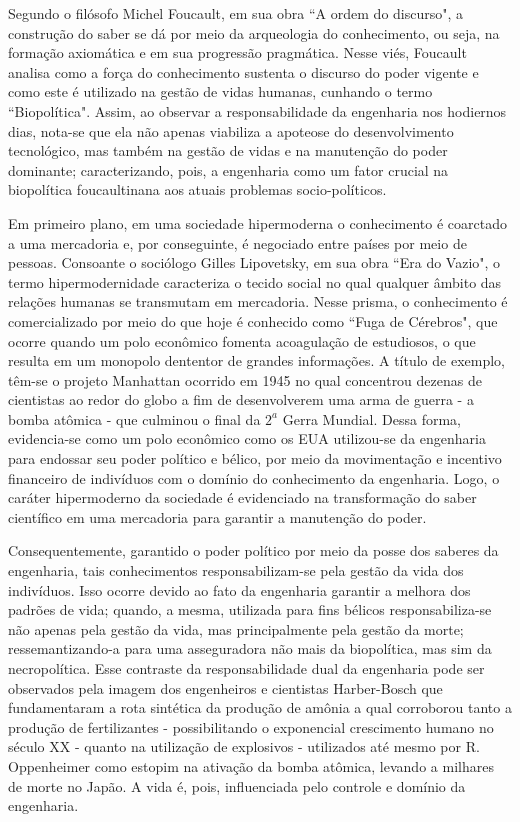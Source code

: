\documentclass{article}
\begin{document}
Segundo o filósofo Michel Foucault, em sua obra “A ordem do discurso", a construção do saber se dá por meio da arqueologia do conhecimento, ou seja, na formação axiomática e em sua progressão pragmática. Nesse viés, Foucault analisa como a força do conhecimento sustenta o discurso do poder vigente e como este é utilizado na gestão de vidas humanas, cunhando o termo “Biopolítica". Assim, ao observar a responsabilidade da engenharia nos hodiernos dias, nota-se que ela não apenas viabiliza a apoteose do desenvolvimento tecnológico, mas também na gestão de vidas e na manutenção do poder dominante; caracterizando, pois, a engenharia como um fator crucial na biopolítica foucaultinana aos atuais problemas socio-políticos.

Em primeiro plano, em uma sociedade hipermoderna o conhecimento é coarctado a uma mercadoria e, por conseguinte, é negociado entre países por meio de pessoas. Consoante o sociólogo Gilles Lipovetsky, em sua obra “Era do Vazio", o termo hipermodernidade caracteriza o tecido social no qual qualquer âmbito das relações humanas se transmutam em mercadoria. Nesse prisma, o conhecimento é comercializado por meio do que hoje é conhecido como “Fuga de Cérebros", que ocorre quando um polo econômico fomenta acoagulação de estudiosos, o que resulta em um monopolo dententor de grandes informações. A título de exemplo, têm-se o projeto Manhattan ocorrido em 1945 no qual concentrou dezenas de cientistas ao redor do globo a fim de desenvolverem uma arma de guerra - a bomba atômica - que culminou o final da $2^a$ Gerra Mundial. Dessa forma, evidencia-se como um polo econômico como os EUA utilizou-se da engenharia para endossar seu poder político e bélico,  por meio da movimentação e incentivo financeiro de indivíduos com o domínio do conhecimento da engenharia. Logo, o caráter hipermoderno da sociedade é evidenciado na transformação do saber científico em uma mercadoria para garantir a manutenção do poder.

Consequentemente, garantido o poder político por meio da posse dos saberes da engenharia, tais conhecimentos responsabilizam-se pela gestão da vida dos indivíduos. Isso ocorre devido ao fato da engenharia garantir a melhora dos padrões de vida; quando, a mesma, utilizada para fins bélicos responsabiliza-se não apenas pela gestão da vida, mas principalmente pela gestão da morte; ressemantizando-a para uma asseguradora não mais da biopolítica, mas sim da necropolítica. Esse contraste da responsabilidade dual da engenharia pode ser observados pela imagem dos engenheiros e cientistas Harber-Bosch que fundamentaram a rota sintética da produção de amônia a qual corroborou tanto a produção de fertilizantes - possibilitando o exponencial crescimento humano no século XX - quanto na utilização de explosivos - utilizados até mesmo por R. Oppenheimer como estopim na ativação da bomba atômica, levando a milhares de morte no Japão. A vida é, pois, influenciada pelo controle e domínio da engenharia.
\end{document}
